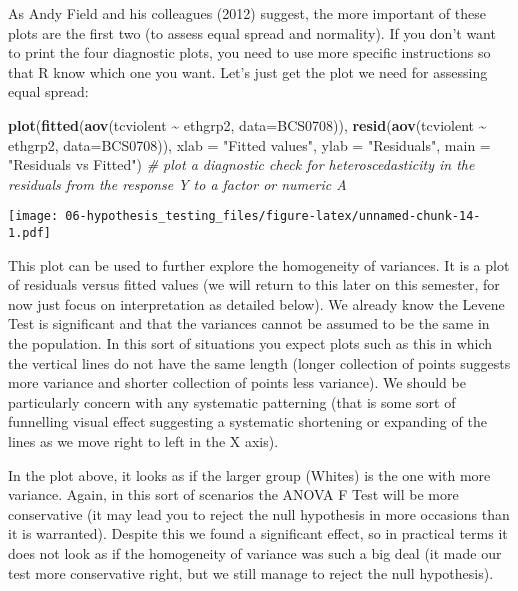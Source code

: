 \documentclass[
]{book}
\newenvironment{Shaded}{\begin{snugshade}}{\end{snugshade}}
\newcommand{\AttributeTok}[1]{\textcolor[rgb]{0.13,0.29,0.53}{#1}}
\newcommand{\CommentTok}[1]{\textcolor[rgb]{0.56,0.35,0.01}{\textit{#1}}}
\newcommand{\FunctionTok}[1]{\textcolor[rgb]{0.13,0.29,0.53}{\textbf{#1}}}
\newcommand{\NormalTok}[1]{#1}
\newcommand{\SpecialCharTok}[1]{\textcolor[rgb]{0.81,0.36,0.00}{\textbf{#1}}}
\newcommand{\StringTok}[1]{\textcolor[rgb]{0.31,0.60,0.02}{#1}}
\begin{document}
As Andy Field and his colleagues (2012) suggest, the more important of these plots are the first two (to assess equal spread and normality). If you don't want to print the four diagnostic plots, you need to use more specific instructions so that R know which one you want. Let's just get the plot we need for assessing equal spread:

\begin{Shaded}
\begin{Highlighting}[]
\FunctionTok{plot}\NormalTok{(}\FunctionTok{fitted}\NormalTok{(}\FunctionTok{aov}\NormalTok{(tcviolent }\SpecialCharTok{\textasciitilde{}}\NormalTok{ ethgrp2, }\AttributeTok{data=}\NormalTok{BCS0708)), }\FunctionTok{resid}\NormalTok{(}\FunctionTok{aov}\NormalTok{(tcviolent }\SpecialCharTok{\textasciitilde{}}\NormalTok{ ethgrp2, }\AttributeTok{data=}\NormalTok{BCS0708)), }\AttributeTok{xlab =} \StringTok{"Fitted values"}\NormalTok{, }\AttributeTok{ylab =} \StringTok{"Residuals"}\NormalTok{, }\AttributeTok{main =} \StringTok{"Residuals vs Fitted"}\NormalTok{)     }\CommentTok{\# plot a diagnostic check for heteroscedasticity in the residuals from the response Y to a factor or numeric A}
\end{Highlighting}
\end{Shaded}

\texttt{[image: 06-hypothesis\_testing\_files/figure-latex/unnamed-chunk-14-1.pdf]}

This plot can be used to further explore the homogeneity of variances. It is a plot of residuals versus fitted values (we will return to this later on this semester, for now just focus on interpretation as detailed below). We already know the Levene Test is significant and that the variances cannot be assumed to be the same in the population. In this sort of situations you expect plots such as this in which the vertical lines do not have the same length (longer collection of points suggests more variance and shorter collection of points less variance). We should be particularly concern with any systematic patterning (that is some sort of funnelling visual effect suggesting a systematic shortening or expanding of the lines as we move right to left in the X axis).

In the plot above, it looks as if the larger group (Whites) is the one with more variance. Again, in this sort of scenarios the ANOVA F Test will be more conservative (it may lead you to reject the null hypothesis in more occasions than it is warranted). Despite this we found a significant effect, so in practical terms it does not look as if the homogeneity of variance was such a big deal (it made our test more conservative right, but we still manage to reject the null hypothesis).
\end{document}
